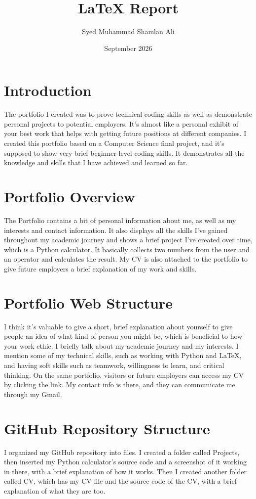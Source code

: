 \documentclass[12pt,a4paper]{article}
\title{LaTeX Report}
\author{Syed Muhammad Shamlan Ali}
\date{September 2026}
\begin{document}
\maketitle

\section{Introduction}
The portfolio I created was to prove technical coding skills as well as demonstrate personal projects to potential employers. It's almost like a personal exhibit of your best work that helps with getting future
positions at different companies. I created this portfolio based on a Computer Science final project, and it's 
supposed to show very brief beginner-level coding skills. It demonstrates all the knowledge and skills that I have achieved and learned so far.


\section{Portfolio Overview}
The Portfolio contains a bit of personal information about me, as well as my interests and contact information. It also displays all the skills I've gained throughout my academic journey and shows a brief project I've created over time, which is a Python calculator. It basically collects two numbers from the user and an operator and calculates the result. My CV is also attached to the portfolio to give future employers a brief explanation of my work and skills.

\section{Portfolio Web Structure}
I think it's valuable to give a short, brief explanation about yourself to give people an idea of what kind of person you might be, which is beneficial to how your work ethic. I briefly talk about my academic journey and my interests. I mention some of my technical skills, such as working with Python and LaTeX, and having soft skills
such as teamwork, willingness to learn, and critical thinking. On the same portfolio, visitors or future employers can access my CV by clicking the link. My contact info is there, and they can communicate me through my Gmail.

\section{GitHub Repository Structure}
I organized my GitHub repository into files. I created a folder called Projects, then inserted my Python calculator's source code and a screenshot of it working in there, with a brief explanation of how it works. Then I created another folder called CV, which has my CV file and the source code of the CV, with a brief explanation of what they are too.
\end{document}
